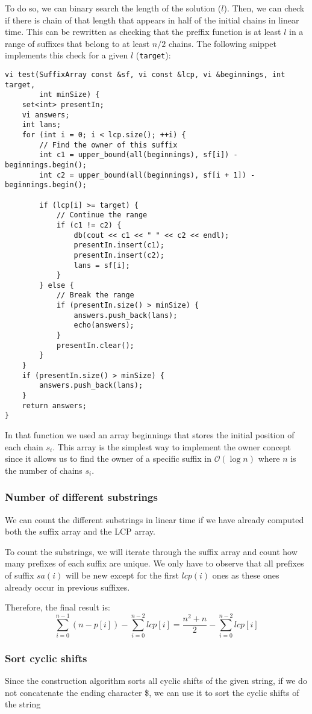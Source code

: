 To do so, we can binary search the length of the solution ($l$). Then, we can check
if there is chain of that length that appears in half of the initial chains in 
linear time. This can be rewritten as checking that the preffix function is 
at least $l$ in a range of suffixes that belong to at least $n/2$ chains.
The following snippet implements this check for a given $l$ (\texttt{target}):
\begin{verbatim}
vi test(SuffixArray const &sf, vi const &lcp, vi &beginnings, int target,
        int minSize) {
    set<int> presentIn;
    vi answers;
    int lans;
    for (int i = 0; i < lcp.size(); ++i) {
		// Find the owner of this suffix
        int c1 = upper_bound(all(beginnings), sf[i]) - beginnings.begin();
        int c2 = upper_bound(all(beginnings), sf[i + 1]) - beginnings.begin();

        if (lcp[i] >= target) {
            // Continue the range
            if (c1 != c2) {
                db(cout << c1 << " " << c2 << endl);
                presentIn.insert(c1);
                presentIn.insert(c2);
                lans = sf[i];
            }
        } else {
            // Break the range
            if (presentIn.size() > minSize) {
                answers.push_back(lans);
                echo(answers);
            }
            presentIn.clear();
        }
    }
    if (presentIn.size() > minSize) {
        answers.push_back(lans);
    }
    return answers;
}
\end{verbatim}
In that function we used an array beginnings that stores the initial position of
each chain $s_i$. This array is the simplest way to implement the owner concept since
it allows us to find the owner of a specific suffix in $\mathcal{O}(\log n)$ where
$n$ is the number of chains $s_i$.

\subsubsection{Number of different substrings}
We can count the different substrings in linear time if we have 
already computed both the suffix array and the LCP array. 

To count the substrings, we will iterate through the suffix array and
count how many prefixes of each suffix are unique. We only have to 
observe that all prefixes of suffix $sa(i)$ will be new except for
the first $lcp(i)$ ones  as these ones already occur in  previous
suffixes. 

Therefore, the final result is:
\[
\sum_{i=0}^{n-1}(n-p[i]) - \sum_{i=0}^{n-2}lcp[i] = \frac{n^2+n}2
- \sum_{i=0}^{n-2}lcp[i]
\]
\subsubsection{Sort cyclic shifts}
Since the construction algorithm sorts all cyclic shifts
of the given string, if we do not concatenate the ending
character \$, we can use it to sort the cyclic shifts 
of the string




















